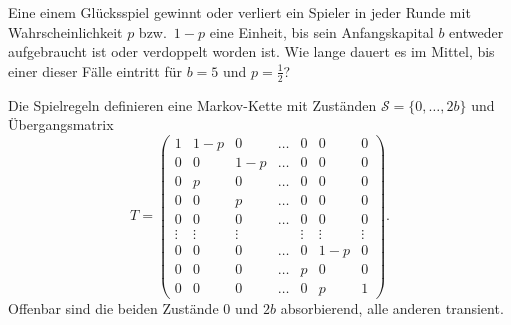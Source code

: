 Eine einem Glücksspiel gewinnt oder verliert ein Spieler in
jeder Runde mit Wahrscheinlichkeit $p$ bzw.~$1-p$ eine Einheit, bis
sein Anfangskapital $b$ entweder aufgebraucht ist oder verdoppelt
worden ist.
Wie lange dauert es im Mittel, bis einer dieser Fälle eintritt für
$b=5$ und $p=\frac12$?

\begin{loesung}
Die Spielregeln definieren eine Markov-Kette mit Zuständen
$\mathcal{S}=\{0,\dots,2b\}$ und Übergangsmatrix
\[
T=\left(
\begin{array}{c|ccccc|c}
   1   &  1-p  &   0   &\dots  &   0   &   0   &   0   \\
\hline
   0   &   0   &  1-p  &\dots  &   0   &   0   &   0   \\
   0   &   p   &   0   &\dots  &   0   &   0   &   0   \\
   0   &   0   &   p   &\dots  &   0   &   0   &   0   \\
   0   &   0   &   0   &\dots  &   0   &   0   &   0   \\
\vdots &\vdots &\vdots &       &\vdots &\vdots &\vdots \\
   0   &   0   &   0   &\dots  &   0   &  1-p  &   0   \\
   0   &   0   &   0   &\dots  &   p   &   0   &   0   \\
\hline
   0   &   0   &   0   &\dots  &   0   &   p   &   1   
\end{array}
\right).
\]
Offenbar sind die beiden Zustände $0$ und $2b$ absorbierend, alle
anderen transient.


\end{loesung}
